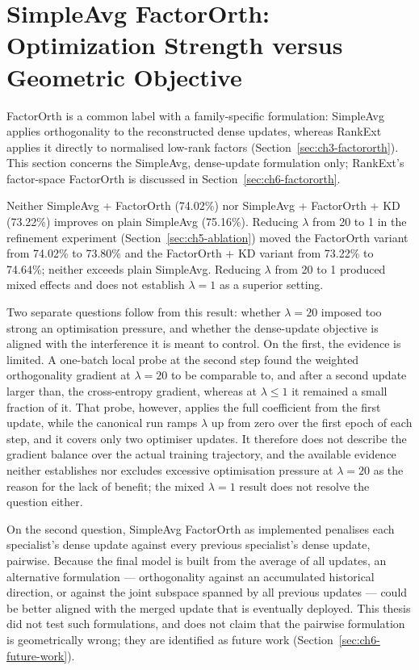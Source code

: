 \section{SimpleAvg FactorOrth: Optimization Strength versus Geometric Objective}
\label{sec:ch6-sa-factororth}

FactorOrth is a common label with a family-specific formulation: SimpleAvg
applies orthogonality to the reconstructed dense updates, whereas RankExt
applies it directly to normalised low-rank factors
(Section~\ref{sec:ch3-factororth}). This section concerns the SimpleAvg,
dense-update formulation only; RankExt's factor-space FactorOrth is
discussed in Section~\ref{sec:ch6-factororth}.

Neither SimpleAvg + FactorOrth (74.02\%) nor SimpleAvg + FactorOrth + KD
(73.22\%) improves on plain SimpleAvg (75.16\%). Reducing $\lambda$ from 20
to 1 in the refinement experiment (Section~\ref{sec:ch5-ablation}) moved
the FactorOrth variant from 74.02\% to 73.80\% and the FactorOrth + KD
variant from 73.22\% to 74.64\%; neither exceeds plain SimpleAvg. Reducing
$\lambda$ from 20 to 1 produced mixed effects and does not establish
$\lambda=1$ as a superior setting.

Two separate questions follow from this result: whether $\lambda=20$
imposed too strong an optimisation pressure, and whether the dense-update
objective is aligned with the interference it is meant to control. On the
first, the evidence is limited. A one-batch local probe at the second step
found the weighted orthogonality gradient at $\lambda=20$ to be comparable
to, and after a second update larger than, the cross-entropy gradient,
whereas at $\lambda\le1$ it remained a small fraction of it. That probe,
however, applies the full coefficient from the first update, while the
canonical run ramps $\lambda$ up from zero over the first epoch of each
step, and it covers only two optimiser updates. It therefore does not
describe the gradient balance over the actual training trajectory, and the
available evidence neither establishes nor excludes excessive optimisation
pressure at $\lambda=20$ as the reason for the lack of benefit; the mixed
$\lambda=1$ result does not resolve the question either.

On the second question, SimpleAvg FactorOrth as implemented penalises each
specialist's dense update against every previous specialist's dense update,
pairwise. Because the final model is built from the average of all
updates, an alternative formulation --- orthogonality against an
accumulated historical direction, or against the joint subspace spanned by
all previous updates --- could be better aligned with the merged update
that is eventually deployed. This thesis did not test such formulations, and
does not claim that the pairwise formulation is geometrically wrong; they
are identified as future work (Section~\ref{sec:ch6-future-work}).

